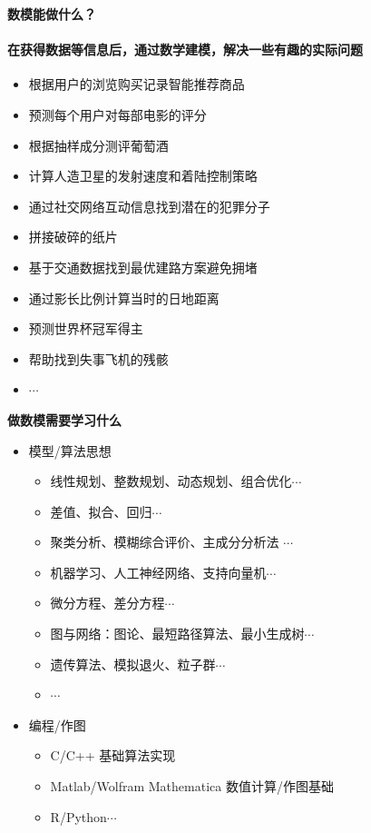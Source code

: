 \documentclass[presentation]{beamer}
\begin{document}
\begin{CJK*}{UTF8}{gbsn}
\begin{frame}{\textbf{数模能做什么？}}
	\framesubtitle{在获得数据等信息后，通过数学建模，解决一些有趣的实际问题}
	\begin{itemize}
		\item 根据用户的浏览购买记录智能推荐商品
		\item 预测每个用户对每部电影的评分
		\item 根据抽样成分测评葡萄酒
		\item 计算人造卫星的发射速度和着陆控制策略
		\item 通过社交网络互动信息找到潜在的犯罪分子
		\item 拼接破碎的纸片
		\item 基于交通数据找到最优建路方案避免拥堵
		\item 通过影长比例计算当时的日地距离
		\item 预测世界杯冠军得主
		\item 帮助找到失事飞机的残骸
		\item $ \cdots $
	\end{itemize}
	
\end{frame}

\begin{frame}{\textbf{做数模需要学习什么}}\label{content}
	\begin{itemize}
	\item 模型/算法思想 
	
	\begin{itemize}
		\item 线性规划、整数规划、动态规划、组合优化$\cdots$
		\item 差值、拟合、回归$\cdots$
		\item 聚类分析、模糊综合评价、主成分分析法 $\cdots$
		\item 机器学习、人工神经网络、支持向量机$\cdots$
		\item 微分方程、差分方程$\cdots$
		\item 图与网络：图论、最短路径算法、最小生成树$\cdots$
		\item 遗传算法、模拟退火、粒子群$\cdots$
		\item $\cdots$
	\end{itemize}
	
	\item 编程/作图
	\begin{itemize}
		\item C/C++ 基础算法实现
		\item Matlab/Wolfram Mathematica 数值计算/作图基础
		\item R/Python$\cdots$
	\end{itemize}
	

\end{itemize}
\end{frame}
\end{CJK*}
\end{document}
